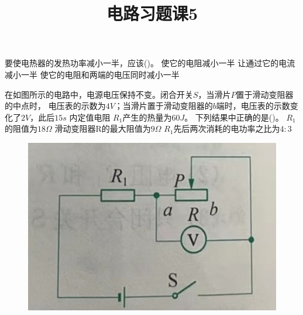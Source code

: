 \documentclass[a4paper,cs4size]{BHCexam}
\title{电路习题课5}
\begin{document}
\maketitle
\begin{groups}

    \begin{questions}[]

        \question[5] 要使电热器的发热功率减小一半，应该(\quad\quad\quad)。
        {使它的电阻减小一半}
        {让通过它的电流减小一半}
        {使它的电阻和两端的电压同时减小一半}
        \vspace{2.5cm}



        \question[5] 在如图所示的电路中，电源电压保持不变。闭合开关$S$，当滑片$P$置于滑动变阻器的中点时，
        电压表的示数为$4V$；当滑片置于滑动变阻器的$b$端时，电压表的示数变化了$2V$，此后$15s$ 内定值电阻 $R_1$产生的热量为$60J$。
        下列结果中正确的是(\quad\quad\quad)。
        {$R_1$的阻值为$18\Omega$}
        {滑动变阻器R的最大阻值为$9\Omega$}
        {$R_1$先后两次消耗的电功率之比为$4:3$}
        \begin{figure}[htb]
            \flushright
            \includegraphics [scale=0.45,trim=0 0 0 0]{./image/physics_circuit5_1.png}
            \label{fig:fig_circuit5_1}
        \end{figure}
        \vspace{2.5cm}


\end{questions}
\end{groups}
\end{document}
